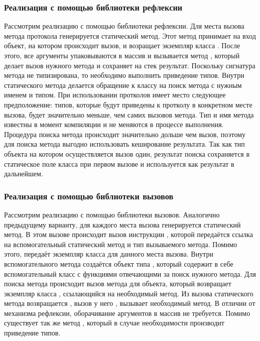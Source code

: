 \subsubsection{Реализация с помощью библиотеки рефлексии}
Рассмотрим реализацию с помощью библиотеки рефлексии. Для места вызова метода протокола генерируется статический метод. Этот метод принимает на вход объект, на котором происходит вызов, и возращает экземпляр класса . После этого, все аргументы упаковываются в массив и вызывается метод , который делает вызов нужного метода и сохраняет на стек результат. Поскольку сигнатура метода  не типизирована, то необходимо выполнить приведение типов. Внутри статического метода делается обращение к классу на поиск метода с нужным именем и типом. При использовании протколов имеет место следующее предположение: типов, которые будут приведены к протколу в конкретном месте вызова, будет значительно меньше, чем самих вызовов метода. Тип и имя метода известны в момент компиляции и не меняются в процессе выполнения. Процедура поиска метода происходит значительно дольше чем вызов, поэтому для поиска метода выгодно использовать кеширование результата. Так как тип объекта на котором осуществляется вызов один, результат поиска сохраняется в статическое поле класса при первом вызове и используется как результат в дальнейшем.

\subsubsection{Реализация с помощью библиотеки вызовов}
Рассмотрим реализацию с помощью библиотеки вызовов. Аналогично предыдущему варианту, для каждого места вызова генерируется статический метод. В этом вызове происходит вызов инструкции , которой передаётся ссылка на вспомогательный статический метод и тип вызываемого метода. Помимо этого,  передаёт экземпляр класса  для данного места вызова. Внутри вспомогательного метода создаётся объект типа , который содержит в себе вспомогательный класс с функциями отвечающими за поиск нужного метода. Для поиска метода происходит вызов метода  для объекта, который возвращает экземпляр класса , ссылающийся на необходимый метод. Из вызова статического метода возвращается , вызов у него , вызывает необходимый метод. В отличии от механизма рефлексии, оборачивание аргументов в массив не требуется. Помимо  существует так же метод , который в случае необходимости производит приведение типов.

